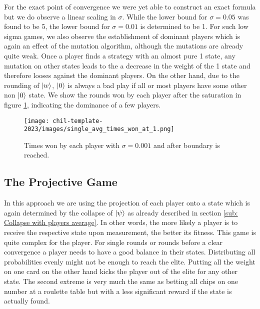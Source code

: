 For the exact point of convergence we were yet able to construct an exact formula but we do observe a linear scaling in $\sigma$. While the lower bound for $\sigma = 0.05$ was found to be 5, the lower bound for $\sigma = 0.01$ is determined to be 1. For such low sigma games, we also observe the establishment of dominant players which is again an effect of the mutation algorithm, although the mutations are already quite weak. Once a player finds a strategy with an almost pure 1 state, any mutation on other states leads to the a decrease in the weight of the 1 state and therefore looses against the dominant players. On the other hand, due to the rounding of $\ket{w}$, $\ket{0}$ is always a bad play if all or most players have some other non $\ket{0}$ state. We show the rounds won by each player after the saturation in figure \ref{fig:single_avg_times_won_at_1}, indicating the dominance of a few players.

\begin{figure}[ht]
    \centering
    \texttt{[image: chil-template-2023/images/single\_avg\_times\_won\_at\_1.png]}
    \caption{Times won by each player with $\sigma = 0.001$ and after boundary is reached.}
    \label{fig:single_avg_times_won_at_1}
\end{figure}

\subsection{The Projective Game}

In this approach we are using the projection of each player onto a state which is again determined by the collapse of $\ket{\psi}$ as already described in section \ref{sub: Collapse with players average}. In other words, the more likely a player is to receive the respective state upon measurement, the better its fitness. This game is quite complex for the player. For single rounds or rounds before a  clear convergence a player needs to have a good balance in their states. Distributing all probabilities evenly might not be enough to reach the elite. Putting all the weight on one card on the other hand kicks the player out of the elite for any other state. The second extreme is very much the same as betting all chips on one number at a roulette table but with a less significant reward if the state is actually found.\\

